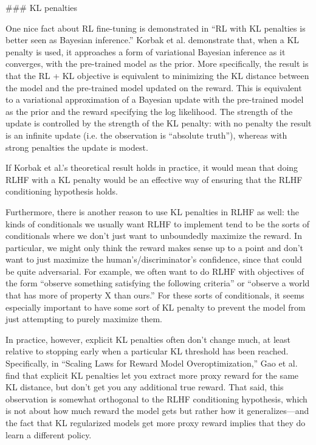 {### KL penalties

One nice fact about RL fine-tuning is demonstrated in ``RL with KL penalties is better seen as Bayesian inference\cite{TODO: cite https://www.alignmentforum.org/posts/eoHbneGvqDu25Hasc/rl-with-kl-penalties-is-better-seen-as-bayesian-inference}.'' Korbak et al. demonstrate that, when a KL penalty is used, it approaches a form of variational Bayesian inference as it converges, with the pre-trained model as the prior. More specifically, the result is that the RL + KL objective is equivalent to minimizing the KL distance between the model and the pre-trained model updated on the reward. This is equivalent to a variational approximation of a Bayesian update with the pre-trained model as the prior and the reward specifying the log likelihood. The strength of the update is controlled by the strength of the KL penalty: with no penalty the result is an infinite update (i.e. the observation is ``absolute truth''), whereas with strong penalties the update is modest.

If Korbak et al.'s theoretical result holds in practice, it would mean that doing RLHF with a KL penalty would be an effective way of ensuring that the RLHF conditioning hypothesis holds.

Furthermore, there is another reason to use KL penalties in RLHF as well: the kinds of conditionals we usually want RLHF to implement tend to be the sorts of conditionals where we don't just want to unboundedly maximize the reward. In particular, we might only think the reward makes sense up to a point and don't want to just maximize the human's/discriminator's confidence, since that could be quite adversarial. For example, we often want to do RLHF with objectives of the form ``observe something satisfying the following criteria'' or ``observe a world that has more of property X than ours.'' For these sorts of conditionals, it seems especially important to have some sort of KL penalty to prevent the model from just attempting to purely maximize them.

In practice, however, explicit KL penalties often don't change much, at least relative to stopping early when a particular KL threshold has been reached. Specifically, in ``Scaling Laws for Reward Model Overoptimization\cite{TODO: cite https://arxiv.org/abs/2210.10760},'' Gao et al. find that explicit KL penalties let you extract more proxy reward for the same KL distance, but don't get you any additional true reward. That said, this observation is somewhat orthogonal to the RLHF conditioning hypothesis, which is not about how much reward the model gets but rather how it generalizes---and the fact that KL regularized models get more proxy reward implies that they do learn a different policy.

}
